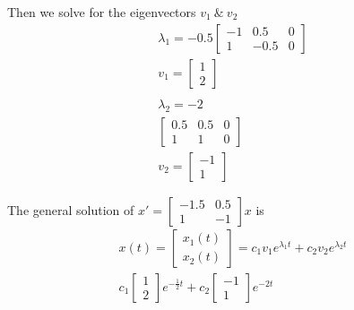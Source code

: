 \documentclass{article}
\begin{document}
    Then we solve for the eigenvectors $ v_1 ~\&~ v_2 $
    \[
        \begin{gathered}
        \lambda_1=-0.5
        \begin{bmatrix}
            -1 &0.5 &0\\
            1 &-0.5 &0
        \end{bmatrix}\\
        v_1=\begin{bmatrix}
            1\\
            2
        \end{bmatrix}\\
        ~\\
        \lambda_2 = -2\\
        \begin{bmatrix}
            0.5 &0.5 &0\\
            1 &1 &0
        \end{bmatrix}\\
        v_2=\begin{bmatrix}
            -1\\
            1
        \end{bmatrix}
        \end{gathered}
    \]

    The general solution of $ x'=\begin{bmatrix}
        -1.5 &0.5\\
        1 &-1
    \end{bmatrix}x $ is
    \[
        \begin{gathered}
        x(t)=\begin{bmatrix}
            x_1(t)\\
            x_2(t)
        \end{bmatrix}=c_1v_1e^{\lambda_1 t} + c_2v_2 e^{\lambda_2 t}\\
        c_1 \begin{bmatrix}
            1\\
            2
        \end{bmatrix}e^{-\frac{1}{2}t}+c_2\begin{bmatrix}
            -1\\
            1
        \end{bmatrix} e^{-2t}  
        \end{gathered}
    \]
    
\end{document}
